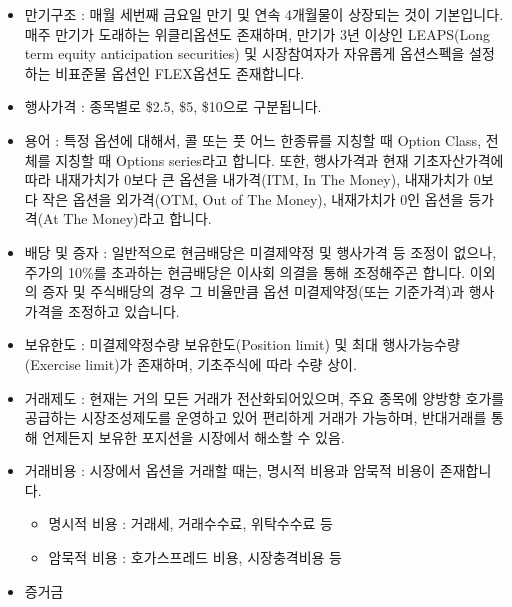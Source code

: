 \documentclass[
  letterpaper,
  DIV=11,
  numbers=noendperiod]{scrreprt}
\providecommand{\tightlist}{%
  \setlength{\itemsep}{0pt}\setlength{\parskip}{0pt}}\usepackage{longtable,booktabs,array}
\begin{document}
\begin{itemize}
\tightlist
\item
  만기구조 : 매월 세번째 금요일 만기 및 연속 4개월물이 상장되는 것이
  기본입니다. 매주 만기가 도래하는 위클리옵션도 존재하며, 만기가 3년
  이상인 LEAPS(Long term equity anticipation securities) 및 시장참여자가
  자유롭게 옵션스펙을 설정하는 비표준물 옵션인 FLEX옵션도 존재합니다.
\item
  행사가격 : 종목별로 \$2.5, \$5, \$10으로 구분됩니다.
\item
  용어 : 특정 옵션에 대해서, 콜 또는 풋 어느 한종류를 지칭할 때 Option
  Class, 전체를 지칭할 때 Options series라고 합니다. 또한, 행사가격과
  현재 기초자산가격에 따라 내재가치가 0보다 큰 옵션을 내가격(ITM, In The
  Money), 내재가치가 0보다 작은 옵션을 외가격(OTM, Out of The Money),
  내재가치가 0인 옵션을 등가격(At The Money)라고 합니다.
\item
  배당 및 증자 : 일반적으로 현금배당은 미결제약정 및 행사가격 등 조정이
  없으나, 주가의 10\%를 초과하는 현금배당은 이사회 의결을 통해
  조정해주곤 합니다. 이외의 증자 및 주식배당의 경우 그 비율만큼 옵션
  미결제약정(또는 기준가격)과 행사가격을 조정하고 있습니다.
\item
  보유한도 : 미결제약정수량 보유한도(Position limit) 및 최대
  행사가능수량(Exercise limit)가 존재하며, 기초주식에 따라 수량 상이.
\item
  거래제도 : 현재는 거의 모든 거래가 전산화되어있으며, 주요 종목에
  양방향 호가를 공급하는 시장조성제도를 운영하고 있어 편리하게 거래가
  가능하며, 반대거래를 통해 언제든지 보유한 포지션을 시장에서 해소할 수
  있음.
\item
  거래비용 : 시장에서 옵션을 거래할 때는, 명시적 비용과 암묵적 비용이
  존재합니다.

  \begin{itemize}
  \tightlist
  \item
    명시적 비용 : 거래세, 거래수수료, 위탁수수료 등
  \item
    암묵적 비용 : 호가스프레드 비용, 시장충격비용 등
  \end{itemize}
\item
  증거금


\end{itemize}
\end{document}

